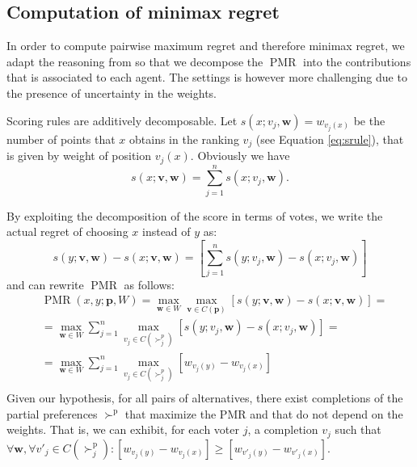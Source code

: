 \documentclass[12pt]{article}
\newcommand{\ppref}{\succ^\text{p}}%
\newcommand{\profile}{\textbf{v}}%
\newcommand{\pprofile}{\textbf{p}}%
\newcommand{\w}{\textbf{w}}%
\DeclareMathOperator{\PMR}{PMR}
\begin{document}
\subsection{Computation of minimax regret}
In order to compute pairwise maximum regret and therefore minimax regret, we adapt the reasoning from \cite{Lu2011} so that we decompose the $\PMR$ into the contributions that is associated to each agent.
The settings is however more challenging due to the presence of uncertainty in the weights.


Scoring rules are additively decomposable.
Let $s(x; v_j,\w)=w_{v_j(x)}$ be the number of points that $x$ obtains in the ranking $v_j$ (see Equation \ref{eq:srule}), that is given by weight of position $v_j(x)$.
Obviously we have 
\[ s(x; \profile, \w) = \sum_{j=1}^n s(x; v_j,\w). \]

By exploiting the decomposition of the score in terms of votes, we write the actual regret of choosing $x$ instead of $y$ as:
\[
s(y; \profile,\w) - s(x; \profile, \w) = [\sum_{j=1}^n s(y; v_j,\w) - s(x; v_j,\w)]
\]
and  can rewrite $\PMR$ as follows:
\begin{align*}
& \PMR(x,y; \pprofile, W) = \max_{\w \in W} \max_{\profile \in C(\pprofile)} [ s(y; \profile,\w) - s(x; \profile,\w) ] = \\
& =  \max_{\w \in W} \sum_{j=1}^{n} \max_{v_j \in C(\succ_j^p)} [s(y; v_j,\w) - s(x; v_j,\w)]=\\
& =  \max_{\w \in W} \sum_{j=1}^{n} \max_{v_j \in C(\succ_j^p)} [w_{v_j(y)} - w_{v_j(x)}] \\
\end{align*}
Given our hypothesis, for all pairs of alternatives, there exist completions of the partial preferences $\ppref$ that maximize the PMR and that do not depend on the weights. 
That is, we can exhibit, for each voter $j$, a completion $v_j$ such that $\forall \w, \forall v'_j \in C(\ppref_j): [w_{v_j(y)} - w_{v_j(x)}] \geq [w_{v'_j(y)} - w_{v'_j(x)}]$.
\end{document}
